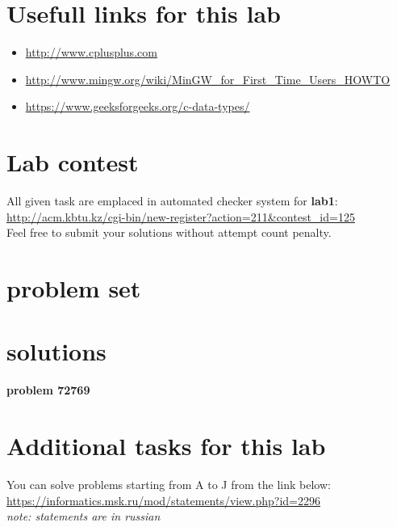 \documentclass[12pt]{article}%
\begin{document}
    \section{Usefull links for this lab}
    \begin{itemize}
        \item \url{http://www.cplusplus.com}
        \item \url{http://www.mingw.org/wiki/MinGW_for_First_Time_Users_HOWTO}
        \item \url{https://www.geeksforgeeks.org/c-data-types/}
    \end{itemize}

    \section{Lab contest}
    All given task are emplaced in automated checker system for \textbf{lab1}: \url{http://acm.kbtu.kz/cgi-bin/new-register?action=211&contest_id=125}\\
    Feel free to submit your solutions without attempt count penalty.

    \section{problem set}
    

    \section{solutions}
    \textbf{problem 72769}
    

    \section{Additional tasks for this lab}
    You can solve problems starting from A to J from the link below:\\
    \url{https://informatics.msk.ru/mod/statements/view.php?id=2296}\\
    \textit{note: statements are in russian}
\end{document}
